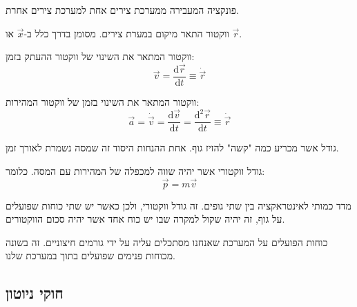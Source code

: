 \documentclass{tstextbook}
\begin{document}
\begin{definition}
פונקציה המעבירה ממערכת צירים אחת למערכת צירים אחרת.

\end{definition}
\begin{proposition}
\end{proposition}
\begin{definition}
ווקטור התאר מיקום במערת צירים. מסומן בדרך כלל ב-\(\vec{x}\) או \(\vec{r}\).

\end{definition}
\begin{definition}
ווקטור המתאר את השינוי של ווקטור ההעתק בזמן:
$$\vec{v}=\frac{\mathrm{d} \vec{r}}{\mathrm{d} t} \equiv \dot{\vec{r}}$$

\end{definition}
\begin{definition}
ווקטור המתאר את השינוי בזמן של ווקטור המהירות:
$$\vec{a}=\dot{\vec{v}}=\frac{\mathrm{d} \vec{v}}{\mathrm{d} t} =\frac{\mathrm{d} ^2\vec{r}}{\mathrm{d} t} \equiv \dot{\vec{r}} $$

\end{definition}
\begin{definition}[מסה]
גודל אשר מכריע כמה "קשה" להזיז גוף. אחת ההנחות היסוד זה שמסה נשמרת לאורך זמן. 

\end{definition}
\begin{definition}[תנע]
גודל ווקטורי אשר יהיה שווה למכפלה של המהירות עם המסה. כלומר:
$$\vec{p}=m\vec{v}$$

\end{definition}
\begin{definition}[כוח]
מדד כמותי לאינטראקציה בין שתי גופים. זה גודל ווקטורי, ולכן כאשר יש שתי כוחות שפועלים על גוף, זה יהיה שקול למקרה שבו יש כוח אחד אשר יהיה סכום הווקטורים.

\end{definition}
\begin{definition}
כוחות הפועלים על המערכת שאנחנו מסתכלים עליה על ידי גורמים חיצוניים. זה בשונה מכוחות פנימים שפועלים בתוך במערכת שלנו.

\end{definition}
\subsection{חוקי ניוטון}
\end{document}

